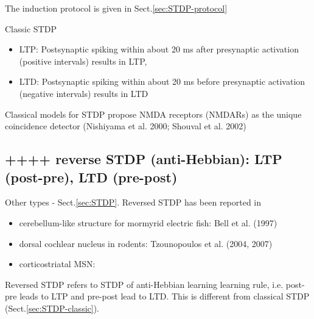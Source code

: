 The induction protocol is given in Sect.\ref{sec:STDP-protocol}

Classic STDP
\begin{itemize}
  \item  LTP: Postsynaptic spiking within about 20 ms after presynaptic
  activation (positive intervals) results in LTP,
  \item LTD: 
Postsynaptic spiking within about 20 ms before presynaptic activation (negative
intervals) results in LTD
\end{itemize}
Classical models for STDP propose NMDA receptors (NMDARs) as the unique
coincidence detector (Nishiyama et al. 2000; Shouval et al. 2002)


% 


\subsection{++++ reverse STDP (anti-Hebbian): LTP (post-pre), LTD (pre-post)}
\label{sec:STDP-reverse}

Other types - Sect.\ref{sec:STDP}. Reversed STDP has been reported in 
\begin{itemize}
  \item cerebellum-like structure for mormyrid electric fish: Bell et al. (1997)
  
  \item dorsal cochlear nucleus in rodents: Tzounopoulos et al. (2004, 2007)
  
  \item corticostriatal MSN: \citep{fino2005}
\end{itemize}

Reversed STDP refers to STDP of anti-Hebbian learning learning rule, i.e.
post-pre leads to LTP and pre-post lead to LTD. This is different from classical
STDP (Sect.\ref{sec:STDP-classic}).




